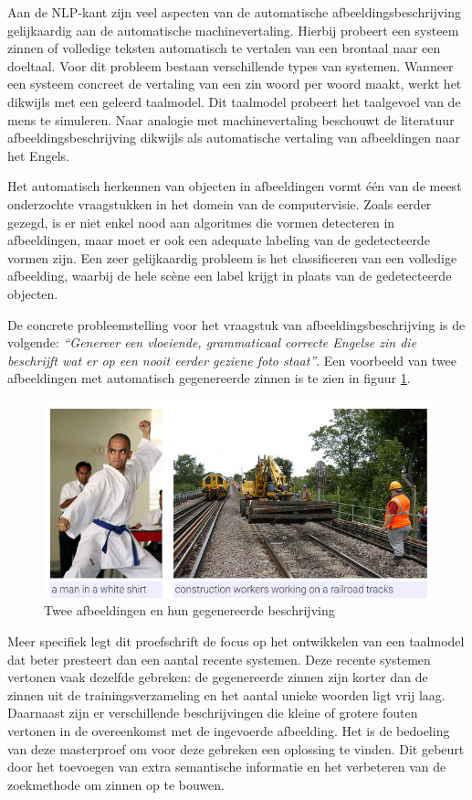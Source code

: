 Aan de NLP-kant zijn veel aspecten van de automatische afbeeldingsbeschrijving gelijkaardig aan de automatische machinevertaling. Hierbij probeert een systeem zinnen of volledige teksten automatisch te vertalen van een brontaal naar een doeltaal. Voor dit probleem bestaan verschillende types van systemen. Wanneer een systeem concreet de vertaling van een zin woord per woord maakt, werkt het dikwijls met een geleerd taalmodel. Dit taalmodel probeert het taalgevoel van de mens te simuleren. Naar analogie met machinevertaling beschouwt de literatuur afbeeldingsbeschrijving dikwijls als automatische vertaling van afbeeldingen naar het Engels.

Het automatisch herkennen van objecten in afbeeldingen vormt \'e\'en van de meest onderzochte vraagstukken in het domein van de computervisie. Zoals eerder gezegd, is er niet enkel nood aan algoritmes die vormen detecteren in afbeeldingen, maar moet er ook een adequate labeling van de gedetecteerde vormen zijn. Een zeer gelijkaardig probleem is het classificeren van een volledige afbeelding, waarbij de hele sc\`ene een label krijgt in plaats van de gedetecteerde objecten.

De concrete probleemstelling voor het vraagstuk van afbeeldingsbeschrijving is de volgende: \emph{``Genereer een vloeiende, grammaticaal correcte Engelse zin die beschrijft wat er op een nooit eerder geziene foto staat''}. Een voorbeeld van twee afbeeldingen met automatisch gegenereerde zinnen is te zien in figuur \ref{fig:examplecaptions}.

\begin{figure}[tb]
    \centering
    \includegraphics[width= 0.85\linewidth]{Images/caption.png}
    \caption{Twee afbeeldingen en hun gegenereerde beschrijving}
    \label{fig:examplecaptions}
\end{figure}

Meer specifiek legt dit proefschrift de focus op het ontwikkelen van een taalmodel dat beter presteert dan een aantal recente systemen. Deze recente systemen vertonen vaak dezelfde gebreken: de gegenereerde zinnen zijn korter dan de zinnen uit de trainingsverzameling en het aantal unieke woorden ligt vrij laag. Daarnaast zijn er verschillende beschrijvingen die kleine of grotere fouten vertonen in de overeenkomst met de ingevoerde afbeelding. Het is de bedoeling van deze masterproef om voor deze gebreken een oplossing te vinden. Dit gebeurt door het toevoegen van extra semantische informatie en het verbeteren van de zoekmethode om zinnen op te bouwen.


